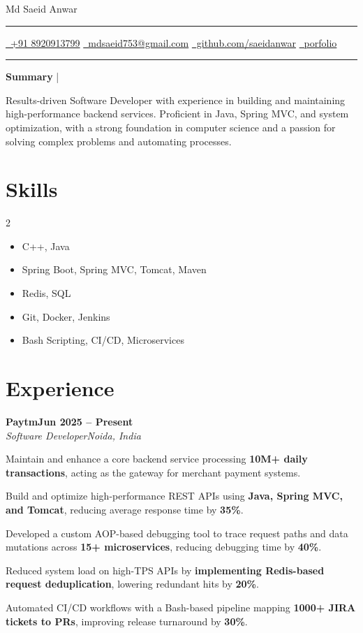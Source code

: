 \documentclass[letterpaper,10pt]{article}
\newcommand{\documentTitle}[2]{
  \begin{center}
    {\Huge\color{accentTitle} #1}
    \vspace{10pt}
    
    {\color{accentLine} \hrule}
    \vspace{2pt}
    \footnotesize{#2}
    \vspace{2pt}
    {\color{accentLine} \hrule}
  \end{center}
}
\newcommand{\tinysection}[1]{
  \phantomsection
  \addcontentsline{toc}{section}{#1}
  {\large{\bfseries\color{accentText}#1} {\color{accentLine} |}}
}
\newcommand{\heading}[2]{
  \hspace{10pt}#1\hfill#2\\
}
\newcommand{\headingBf}[2]{
  \heading{\textbf{#1}}{\textbf{#2}}
}
\newcommand{\headingIt}[2]{
  \heading{\textit{#1}}{\textit{#2}}
}
\newenvironment{resume_list}{
  \vspace{-7pt}
  \begin{itemize}[itemsep=-2px, parsep=1pt, leftmargin=30pt]
}{
  \end{itemize}
}
\begin{document}
  \documentTitle{Md Saeid Anwar}{
    \href{tel:+918920913799}{\faPhone\ +91 8920913799} \quad
    \href{mailto:mdsaeid753@gmail.com}{\faEnvelope\ mdsaeid753@gmail.com} \quad
    \href{https://github.com/saeidanwar}{\faGithub\ github.com/saeidanwar} \quad
    \href{https://saeidanwar.github.io/my_portfolio/}{\faGlobe\ porfolio}
  }

  \tinysection{Summary}
  Results-driven Software Developer with experience in building and maintaining high-performance backend services. Proficient in Java, Spring MVC, and system optimization, with a strong foundation in computer science and a passion for solving complex problems and automating processes.

  \section{Skills}
  \begin{multicols}{2}
    \begin{itemize}[itemsep=-2px, parsep=1pt, leftmargin=75pt]
      \item[\textbf{Languages:}] C++, Java
      \item[\textbf{Backend:}] Spring Boot, Spring MVC, Tomcat, Maven
      \item[\textbf{Databases:}] Redis, SQL
      \item[\textbf{Tools:}] Git, Docker, Jenkins
      \item[\textbf{DevOps:}] Bash Scripting, CI/CD, Microservices
    \end{itemize}
  \end{multicols}

  \section{Experience}
  \headingBf{Paytm}{Jun 2025 -- Present}
  \headingIt{Software Developer}{Noida, India}
    \begin{resume_list}
        \item Maintain and enhance a core backend service processing      \textbf{10M+ daily transactions}, acting as the gateway for merchant payment systems.
        \item Build and optimize high-performance REST APIs using \textbf{Java, Spring MVC, and Tomcat}, reducing average response time by \textbf{35\%}.
        \item Developed a custom AOP-based debugging tool to trace request paths and data mutations across \textbf{15+ microservices}, reducing debugging time by \textbf{40\%}.
        \item Reduced system load on high-TPS APIs by \textbf{implementing Redis-based request deduplication}, lowering redundant hits by \textbf{20\%}.
        \item Automated CI/CD workflows with a Bash-based pipeline mapping \textbf{1000+ JIRA tickets to PRs}, improving release turnaround by \textbf{30\%}.
    \end{resume_list}
\end{document}
